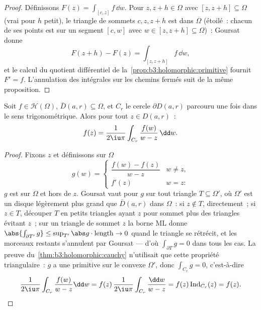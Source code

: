 \begin{proof}
Définissons $F(z) = \int_{[c,z]}f\,\dd w$. Pour $z, z + h \in
\Omega$ avec $[z, z+h] \subseteq \Omega$ (vrai pour $h$ petit),
le triangle de sommets $c, z, z+h$ est  dans $\Omega$
(étoilé~: chacun de ses points est sur un segment $[c, w]$ avec
$w \in [z, z+h] \subseteq \Omega$)~: Goursat donne
\[
F(z + h) - F(z) = \int_{[z, z+h]}f\,\dd w,
\]
et le calcul du quotient différentiel de
la~\cref{prop:b3:holomorphic:primitive} fournit $F' = f$.
L'annulation des intégrales sur les chemins fermés suit de la
même proposition.
\end{proof}

\begin{theorem}
\label{thm:b3:holomorphic:formula}
Soit $f \in \mathcal H(\Omega)$, $\bar D(a, r) \subseteq
\Omega$, et $C_r$ le cercle $\partial D(a,r)$ parcouru une fois
dans le sens trigonométrique. Alors pour tout $z \in D(a, r)$~:
\[
f(z) = \frac1{2\iu\pi}\int_{C_r}\frac{f(w)}{w - z}\,\dd w .
\]
\end{theorem}

\begin{proof}
Fixons $z$ et définissons sur $\Omega$
\[
g(w) = \begin{cases}
\dfrac{f(w) - f(z)}{w - z} & w \neq z,\\[4pt]
f'(z) & w = z :
\end{cases}
\]
$g$ est  sur $\Omega$ et  hors de $z$. Goursat
vaut pour $g$ sur tout triangle $T \subseteq \Omega'$, où
$\Omega'$ est un disque légèrement plus grand que $\bar D(a,r)$
dans $\Omega$~: si $z \notin T$, directement~; si $z \in T$,
découper $T$ en petits triangles ayant $z$ pour sommet plus des
triangles évitant $z$~; sur un triangle de sommet $z$ la borne
ML donne $\abs{\int_{\partial T'}g} \leq \sup_{T'}\abs
g\cdot\operatorname{length} \to 0$ quand le triangle se
rétrécit, et les morceaux restants s'annulent par Goursat ---
d'où $\int_{\partial T}g = 0$ dans tous les cas. La preuve
du~\cref{thm:b3:holomorphic:cauchy} n'utilisait que cette
propriété triangulaire~: $g$ a une primitive sur le convexe
$\Omega'$, donc $\int_{C_r}g = 0$, c'est-à-dire
\[
\frac1{2\iu\pi}\int_{C_r}\frac{f(w)}{w - z}\dd w
= f(z)\,\frac{1}{2\iu\pi}\int_{C_r}\frac{\dd w}{w - z}
= f(z)\operatorname{Ind}_{C_r}(z) = f(z) .
\]
\end{proof}

